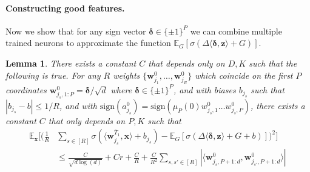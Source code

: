 \documentclass[11pt]{article}
\newcommand{\E}{\mathbb{E}}
\newcommand{\<}{\langle}
\renewcommand{\>}{\rangle}
\newcommand{\sign}{\text{sign}}
\newtheorem{lemma}{Lemma}
\theoremstyle{definition}
\def\bw{{\boldsymbol w}}
\def\bx{{\boldsymbol x}}
\def\bz{{\boldsymbol z}}
\def\bdelta{{\boldsymbol\delta}}
\def\bz{{\boldsymbol z}}
\def\bdelta{{\boldsymbol\delta}}
\def\bw{{\boldsymbol w}}
\def\bx{{\boldsymbol x}}
\def\bz{{\boldsymbol z}}
\def\oT{\overline{T}}
\begin{document}
\paragraph*{Constructing good features.} Now we show that for any sign vector $\bdelta \in \{\pm 1\}^P$ we can combine multiple trained neurons to approximate the function $\E_{G}[\sigma(\Delta\<\bdelta,\bz\> + G)]$.
\begin{lemma}\label{lem:construct-smoothed-activation}
There exists a constant $C$ that depends only on $D,K$ such that the following is true. For any $R$ weights $\{\bw_{j_1}^0, \ldots , \bw_{j_R}^0\}$ which coincide on the first $P$ coordinates $\bw_{j_s,1:P}^0 = \bdelta / \sqrt{d}$ where $\bdelta \in \{\pm 1\}^P$, and with biases $b_{j_s}$ such that $|b_{j_s} - b| \leq 1/R$, and with $\sign(a^0_{j_s}) = \sign(\mu_P(0) w_{j_s,1}^0 \dots w_{j_s,P}^0)$, there exists a constant $C$ that only depends on $P,K$ such that 
\begin{align*}
\E_\bx \Big[ \Big( \frac{1}{R} &\sum_{s \in [R]} \sigma ( \<\bw_{j_s}^{\oT_1} , \bx \> + b_{j_s}) -  \E_G [ \sigma ( \Delta \<\bdelta , \bz\> +G +b)] \Big)^2 \Big] \\
&\leq  \frac{C}{\sqrt{d\log(d)}} + C r + \frac{C}{R} + \frac{C}{R^2} \sum_{s, s' \in [R]} |\<\bw_{j_s,P+1:d}^{0},\bw_{j_{s'},P+1:d}^{0}\>|\,
\end{align*}
\end{lemma}
\end{document}
